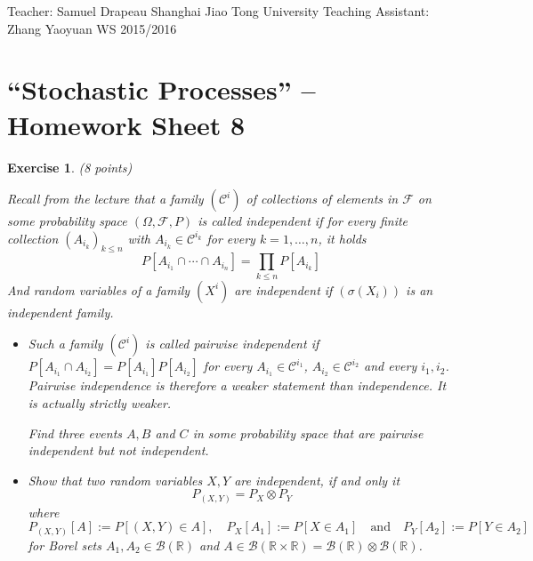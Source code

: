 \documentclass[DIV=classic,a4paper,10pt]{scrartcl}
\newtheorem{exercise}[theorem]{Exercise}
\theoremstyle{nonumberplain}
\numberwithin{equation}{section}
\begin{document}
\noindent
Teacher: Samuel Drapeau \hfill Shanghai Jiao Tong University \newline
Teaching Assistant: Zhang Yaoyuan \hfill WS 2015/2016

\smallskip
\noindent
\hrulefill

\smallskip

\setcounter{section}{8}

\pagestyle{empty}


\section*{``Stochastic Processes'' -- Homework Sheet 8}
\thispagestyle{empty}




\begin{exercise}(8 points)
    
    Recall from the lecture that a family $(\mathcal{C}^i)$ of collections of elements in $\mathcal{F}$ on some probability space $(\Omega,\mathcal{F},P)$ is called \emph{independent} if for every finite collection $(A_{i_k})_{k\leq n}$ with $A_{i_k} \in \mathcal{C}^{i_k}$ for every $k=1,\ldots, n$, it holds
    \begin{equation*}
        P\left[ A_{i_1}\cap \cdots\cap A_{i_n} \right]=\prod_{k\leq n} P\left[ A_{i_k} \right]
    \end{equation*}
    And random variables of a family $(X^i)$ are independent if $(\sigma(X_i))$ is an independent family.
    \begin{itemize}
        \item Such a family $(\mathcal{C}^i)$ is called \emph{pairwise independent} if $P[A_{i_1}\cap A_{i_2}]=P[A_{i_1}]P[A_{i_2}]$ for every $A_{i_1}\in \mathcal{C}^{i_1}$, $A_{i_2}\in \mathcal{C}^{i_2}$ and every $i_1,i_2$.
            Pairwise independence is therefore a weaker statement than independence.
            It is actually strictly weaker.

            Find three events $A,B$ and $C$ in some probability space that are pairwise independent but not independent.
        \item Show that two random variables $X,Y$ are independent, if and only it
            \begin{equation*}
                P_{(X,Y)}=P_{X}\otimes P_{Y}
            \end{equation*}
            where 
            \begin{equation*}
                P_{(X,Y)}[A]:=P[(X,Y)\in A],\quad P_{X}[A_1]:=P[X\in A_1]\quad \text{and}\quad P_{Y}[A_2]:=P[Y\in A_2]
            \end{equation*}
            for Borel sets $A_1,A_2 \in \mathcal{B}(\mathbb{R})$ and $A\in \mathcal{B}(\mathbb{R}\times \mathbb{R})=\mathcal{B}(\mathbb{R})\otimes \mathcal{B}(\mathbb{R})$.
    \end{itemize}


\end{exercise}
\end{document}
